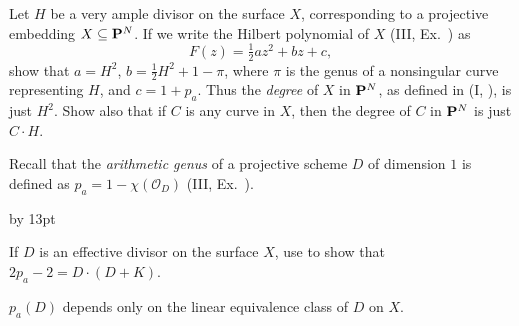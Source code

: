 {{\smallskip
\noindent\hypertarget{ex-V-1.2}{}Let $H$ be a very ample divisor on the surface $X$, corresponding to a projective embedding $X\subseteq\mathbf{P}^N$. If we write the Hilbert polynomial of $X$ (III, Ex.~) as
\[
F(z)=\tfrac12az^2+bz+c,
\]
show that $a=H^2$, $b=\tfrac12H^2+1-\pi$, where $\pi$ is the genus of a nonsingular curve representing $H$, and $c=1+p_a$. Thus the \emph{degree} of $X$ in $\mathbf{P}^N$, as defined in (I, ), is just $H^2$. Show also that if $C$ is any curve in $X$, then the degree of $C$ in $\mathbf{P}^N$ is just $C\cdot H$.

\smallskip
\noindent\hypertarget{ex-V-1.3}{}Recall that the \emph{arithmetic genus} of a projective scheme $D$ of dimension $1$ is defined as $p_a=1-\chi(\mathcal O_D)$ (III, Ex.~).
{\advance\leftskip by 13pt\par
\noindent\hypertarget{ex-V-1.3a}{}If $D$ is an effective divisor on the surface $X$, use  to show that $2p_a-2=D\cdot(D+K)$.

\noindent\hypertarget{ex-V-1.3b}{}$p_a(D)$ depends only on the linear equivalence class of $D$ on $X$.\par}\par}
}
